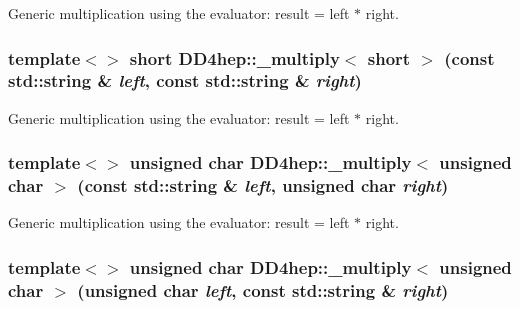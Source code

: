 Generic multiplication using the evaluator: result = left $\ast$ right. \hypertarget{group___d_d4_h_e_p___g_e_o_m_e_t_r_y_ga48c9f3472a9749bd235effa32a604c94}{
\subsubsection[{\_\-multiply$<$ short $>$}]{\setlength{\rightskip}{0pt plus 5cm}template$<$$>$ short DD4hep::\_\-multiply$<$ short $>$ (const std::string \& {\em left}, \/  const std::string \& {\em right})}}
\label{group___d_d4_h_e_p___g_e_o_m_e_t_r_y_ga48c9f3472a9749bd235effa32a604c94}


Generic multiplication using the evaluator: result = left $\ast$ right. \hypertarget{group___d_d4_h_e_p___g_e_o_m_e_t_r_y_ga760735ffda710de230ec1c242034cfca}{
\subsubsection[{\_\-multiply$<$ unsigned char $>$}]{\setlength{\rightskip}{0pt plus 5cm}template$<$$>$ unsigned char DD4hep::\_\-multiply$<$ unsigned char $>$ (const std::string \& {\em left}, \/  unsigned char {\em right})}}
\label{group___d_d4_h_e_p___g_e_o_m_e_t_r_y_ga760735ffda710de230ec1c242034cfca}


Generic multiplication using the evaluator: result = left $\ast$ right. \hypertarget{group___d_d4_h_e_p___g_e_o_m_e_t_r_y_ga4d413f7de335c9fd4445b3001af304d2}{
\subsubsection[{\_\-multiply$<$ unsigned char $>$}]{\setlength{\rightskip}{0pt plus 5cm}template$<$$>$ unsigned char DD4hep::\_\-multiply$<$ unsigned char $>$ (unsigned char {\em left}, \/  const std::string \& {\em right})}}
\label{group___d_d4_h_e_p___g_e_o_m_e_t_r_y_ga4d413f7de335c9fd4445b3001af304d2}


